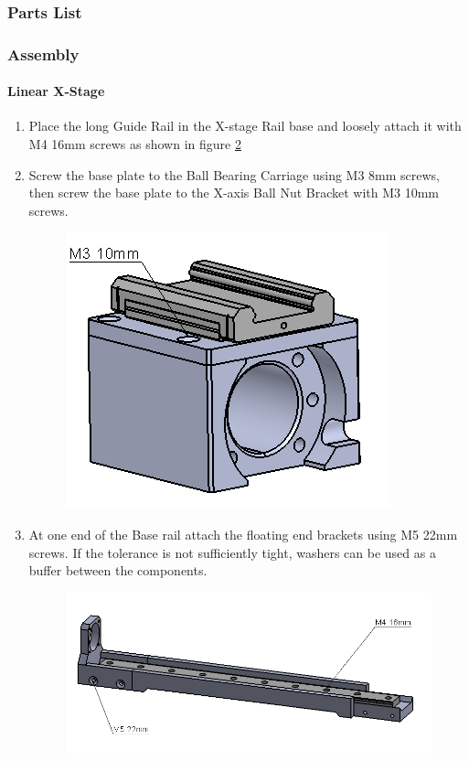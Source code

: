 \subsubsection{Parts List}

\subsubsection{Assembly}
\paragraph{Linear X-Stage}

\begin{enumerate}

\item Place the long Guide Rail in the X-stage Rail base and loosely attach it with M4 16mm screws as shown in figure \ref{fig:xaxis3}



\item Screw the base plate to the Ball Bearing Carriage using M3 8mm screws, then screw the base plate to the X-axis Ball Nut Bracket with M3 10mm screws. 

\begin{figure}
\centering
\includegraphics[scale=0.5]{Platforms/figs/xaxis2.png}
\caption{\label{fig:xaxis2}}
\end{figure}

\item At one end of the Base rail attach the floating end brackets using M5 22mm screws. If the tolerance is not sufficiently tight, washers can be used as a buffer between the components.

\begin{figure}
    \centering
    \includegraphics[scale=0.5]{Platforms/figs/xaxis3.png}
    \caption{\label{fig:xaxis3}}
\end{figure}


\end{enumerate}

